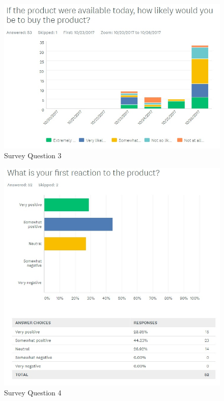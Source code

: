 \documentclass[12pt,a4paper]{article}
\begin{document}
\begin{appendices}
        \begin{figure}[H]
          \centering
          \includegraphics[width=1\textwidth]{../assets/12-2-survey-3.jpg}
          \caption{Survey Question 3}
          \label{fig:Survey Question 3}
        \end{figure}

        \begin{figure}[H]
          \centering
          \includegraphics[width=1\textwidth]{../assets/12-2-survey-4.jpg}
          \caption{Survey Question 4}
          \label{fig:Survey Question 4}
        \end{figure}


\end{appendices}
\end{document}
